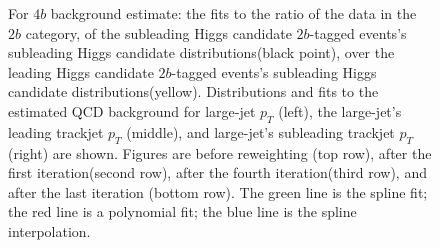 \begin{figure}[htbp!]
\begin{center}
\caption{For $4b$ background estimate: the fits to the ratio of the data in the $2b$ category, of the subleading Higgs candidate $2b$-tagged events's subleading Higgs candidate distributions(black point), over the leading Higgs candidate $2b$-tagged events's subleading Higgs candidate distributions(yellow). Distributions and fits to the estimated QCD background for large-\R jet $p_{T}$ (left),  the large-\R jet's leading trackjet $p_T$ (middle), and large-\R jet's subleading trackjet $p_T$ (right) are shown.  Figures are before reweighting (top row), after the first iteration(second row), after the fourth iteration(third row), and after the last iteration (bottom row). The green line is the spline fit; the red line is a polynomial fit; the blue line is the spline interpolation.}
\label{fig:rw-4b-lead}
\end{center}
\end{figure}

